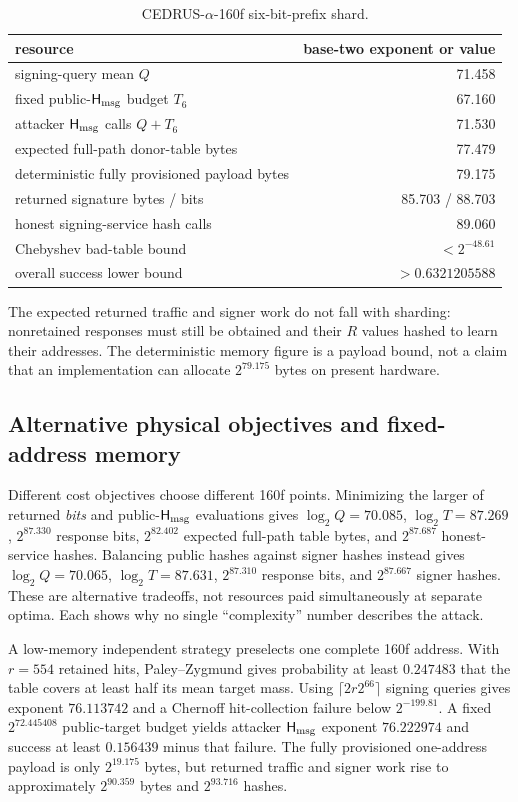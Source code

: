 \documentclass[11pt,a4paper]{article}
\newcommand{\Hmsg}{\ensuremath{\mathsf{H}_{\rm msg}}}
\begin{document}
\begin{table}[ht]
\centering
\caption{CEDRUS-$\alpha$-160f six-bit-prefix shard.}
\label{tab:shard}
\begin{tabular}{lr}
\toprule
resource & base-two exponent or value\\
\midrule
signing-query mean $Q$ &71.458\\
fixed public-$\Hmsg$ budget $T_6$ &67.160\\
attacker $\Hmsg$ calls $Q+T_6$ &71.530\\
expected full-path donor-table bytes &77.479\\
deterministic fully provisioned payload bytes &79.175\\
returned signature bytes / bits &85.703 / 88.703\\
honest signing-service hash calls &89.060\\
Chebyshev bad-table bound &$<2^{-48.61}$\\
overall success lower bound &$>0.6321205588$\\
\bottomrule
\end{tabular}
\end{table}

The expected returned traffic and signer work do not fall with sharding:
nonretained responses must still be obtained and their $R$ values hashed to
learn their addresses.  The deterministic memory figure is a payload bound,
not a claim that an implementation can allocate $2^{79.175}$ bytes on present
hardware.

\subsection{Alternative physical objectives and fixed-address memory}

Different cost objectives choose different 160f points.  Minimizing the larger
of returned \emph{bits} and public-$\Hmsg$ evaluations gives
$\log_2Q=70.085$, $\log_2T=87.269$, $2^{87.330}$ response bits,
$2^{82.402}$ expected full-path table bytes, and $2^{87.687}$ honest-service
hashes.  Balancing public hashes against signer hashes instead gives
$\log_2Q=70.065$, $\log_2T=87.631$, $2^{87.310}$ response bits, and
$2^{87.667}$ signer hashes.  These are alternative tradeoffs, not resources
paid simultaneously at separate optima.  Each shows why no single
``complexity'' number describes the attack.

A low-memory independent strategy preselects one complete 160f address.  With
$r=554$ retained hits, Paley--Zygmund gives probability at least $0.247483$
that the table covers at least half its mean target mass.  Using
$\lceil2r2^{66}\rceil$ signing queries gives exponent $76.113742$ and a
Chernoff hit-collection failure below $2^{-199.81}$.  A fixed
$2^{72.445408}$ public-target budget yields attacker $\Hmsg$ exponent
$76.222974$ and success at least $0.156439$ minus that failure.  The fully
provisioned one-address payload is only $2^{19.175}$ bytes, but returned
traffic and signer work rise to approximately $2^{90.359}$ bytes and
$2^{93.716}$ hashes.
\end{document}
